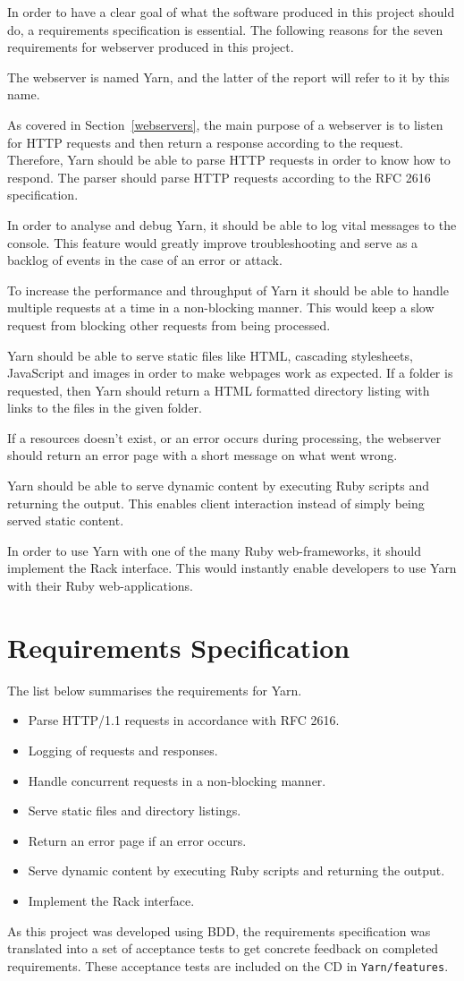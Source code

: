 In order to have a clear goal of what the software produced in this project
should do, a requirements specification is essential. The following reasons
for the seven requirements for webserver produced in this project.

The webserver is named Yarn, and the latter of the report will refer to it by
this name.

As covered in Section~\ref{webservers}, the main purpose of a webserver is to
listen for HTTP requests and then return a response
according to the request. Therefore, Yarn should be able to parse HTTP
requests in order to know how to respond. The parser should parse HTTP
requests according to the RFC 2616 specification.

In order to analyse and debug Yarn, it should be able to log vital
messages to the console. This feature would greatly improve troubleshooting
and serve as a backlog of events in the case of an error or attack.

To increase the performance and throughput of Yarn it should be able
to handle
multiple requests at a time in a non-blocking manner. This would keep a slow
request from blocking other requests from being processed.

Yarn should be able to serve static files like HTML, cascading
stylesheets, JavaScript and images in order to make webpages work as expected.
If a folder is requested, then Yarn should return a HTML
formatted directory listing with links to the files in the given folder. 

If a resources doesn't exist, or an error occurs during processing, the
webserver should return an error page with a short message on what went wrong.

Yarn should be able to serve dynamic content by executing Ruby
scripts and returning the output. This enables client interaction instead of
simply being served static content.

In order to use Yarn with one of the many Ruby web-frameworks, it
should implement the Rack interface. This would instantly enable developers to
use Yarn with their Ruby web-applications.

\section{Requirements Specification}
\label{req_spec}
The list below summarises the requirements for Yarn.

\begin{itemize}
  \item Parse HTTP/1.1 requests in accordance with RFC 2616.
  \item Logging of requests and responses.
  \item Handle concurrent requests in a non-blocking manner.
  \item Serve static files and directory listings.
  \item Return an error page if an error occurs.
  \item Serve dynamic content by executing Ruby scripts and returning the
  output.
  \item Implement the Rack interface.
\end{itemize}

As this project was developed using BDD, the requirements specification was
translated into a set of acceptance tests to get concrete feedback on
completed requirements. These acceptance tests are included on the CD in
\texttt{Yarn/features}.

